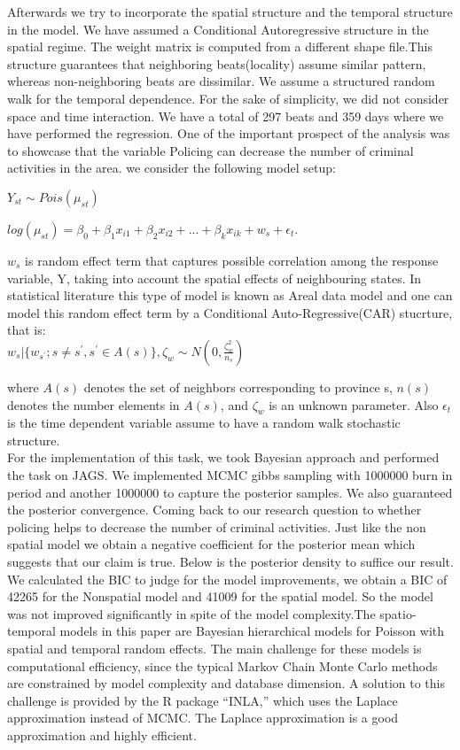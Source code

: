 \documentclass[conference]{IEEEtran}
\begin{document}
Afterwards we try to incorporate the spatial structure and the temporal structure in the model. We have assumed a Conditional Autoregressive structure in the spatial regime. The weight matrix is computed from a different shape file.This structure guarantees that neighboring beats(locality) assume similar pattern, whereas non-neighboring beats are dissimilar. We assume a structured random walk for the temporal dependence. For the sake of simplicity, we did not consider space and time interaction. We have a total of 297 beats and 359 days where we have performed the regression. One of the important prospect of the analysis was to showcase that the variable Policing can decrease the number of criminal activities in the area. we consider the following model setup:

 $Y_{st} \sim Pois(\mu_{st})$
 
 $log(\mu_{st})= \beta_{0} + \beta_{1} x_{i1} + \beta_{2}x_{i2} + ... +\beta_{k}x_{ik} + w_{s} +\epsilon_{t}$.
 
  $w_{s}$ is random effect term that captures possible correlation among the response variable, Y, taking into account the spatial effects of neighbouring states. In statistical literature this type of model is known as Areal data model and one can model this random effect term by a Conditional Auto-Regressive(CAR) stucrture, that is:\\
 
 $w_{s} | \{w_{s^{'}};s\neq s^{'}, s^{'}\in A(s)\},\zeta_{w} \sim N(0,\frac{\zeta_{w}^{2}}{n_{s}})$
 
 
 where $A(s)$ denotes the set of neighbors corresponding to province s, $n(s)$ denotes the number elements in $A(s)$, and $\zeta_{w}$ is an unknown parameter. Also $\epsilon_{t}$ is the time dependent variable assume to have a random walk stochastic structure.\\
 
 For the implementation of this task, we took Bayesian approach and performed the task on JAGS. We implemented MCMC gibbs sampling with 1000000 burn in period and another 1000000 to capture the posterior samples. We also guaranteed the posterior convergence. Coming back to our research question to whether policing helps to decrease the number of criminal activities. Just like the non spatial model we obtain a negative coefficient for the posterior mean which suggests that our claim is true. Below is the posterior density to suffice our result. We calculated the BIC to judge for the model improvements, we obtain a BIC of 42265 for the Nonspatial model and 41009 for the spatial model. So the model was not improved significantly in spite of the model complexity.The spatio-temporal models in this paper are Bayesian hierarchical models for Poisson with spatial and temporal random effects. The main challenge for these
 models is computational efficiency, since the typical Markov Chain Monte Carlo methods are constrained by model complexity and database dimension. A solution to this challenge is
 provided by the R package “INLA,” which uses the Laplace approximation instead of MCMC. The Laplace approximation is a good approximation and highly efficient. 
  
\end{document}
